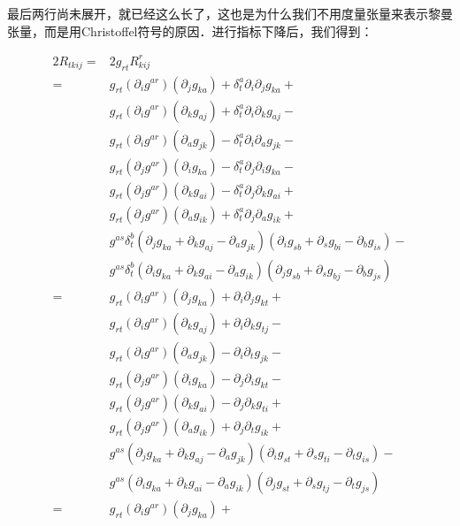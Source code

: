 最后两行尚未展开，就已经这么长了，这也是为什么我们不用度量张量来表示黎曼张量，而是用Christoffel符号的原因．进行指标下降后，我们得到：

\begin{equation}\label{RicciC_eq2}
\begin{aligned}
2R_{tkij}={}&2g_{rt}R^r_{kij}\\
={}&g_{rt}(\partial_ig^{ar})(\partial_jg_{ka})+\delta^a_t\partial_i\partial_jg_{ka}+\\
&g_{rt}(\partial_ig^{ar})(\partial_kg_{aj})+\delta^a_t\partial_i\partial_kg_{aj}-\\
&g_{rt}(\partial_ig^{ar})(\partial_ag_{jk})-\delta^a_t\partial_i\partial_ag_{jk}-\\%
&g_{rt}(\partial_jg^{ar})(\partial_ig_{ka})-\delta^a_t\partial_j\partial_ig_{ka}-\\
&g_{rt}(\partial_jg^{ar})(\partial_kg_{ai})-\delta^a_t\partial_j\partial_kg_{ai}+\\
&g_{rt}(\partial_jg^{ar})(\partial_ag_{ik})+\delta^a_t\partial_j\partial_ag_{ik}+\\%
&g^{as}\delta^b_t(\partial_jg_{ka}+\partial_kg_{aj}-\partial_ag_{jk})(\partial_ig_{sb}+\partial_sg_{bi}-\partial_bg_{is})-\\
&g^{as}\delta^b_t(\partial_ig_{ka}+\partial_kg_{ai}-\partial_ag_{ik})(\partial_jg_{sb}+\partial_sg_{bj}-\partial_bg_{js})\\
={}&g_{rt}(\partial_ig^{ar})(\partial_jg_{ka})+\partial_i\partial_jg_{kt}+\\
&g_{rt}(\partial_ig^{ar})(\partial_kg_{aj})+\partial_i\partial_kg_{tj}-\\
&g_{rt}(\partial_ig^{ar})(\partial_ag_{jk})-\partial_i\partial_tg_{jk}-\\%
&g_{rt}(\partial_jg^{ar})(\partial_ig_{ka})-\partial_j\partial_ig_{kt}-\\
&g_{rt}(\partial_jg^{ar})(\partial_kg_{ai})-\partial_j\partial_kg_{ti}+\\
&g_{rt}(\partial_jg^{ar})(\partial_ag_{ik})+\partial_j\partial_tg_{ik}+\\%
&g^{as}(\partial_jg_{ka}+\partial_kg_{aj}-\partial_ag_{jk})(\partial_ig_{st}+\partial_sg_{ti}-\partial_tg_{is})-\\
&g^{as}(\partial_ig_{ka}+\partial_kg_{ai}-\partial_ag_{ik})(\partial_jg_{st}+\partial_sg_{tj}-\partial_tg_{js})\\
={}&g_{rt}(\partial_ig^{ar})(\partial_jg_{ka})+\\

\end{aligned}
\end{equation}
